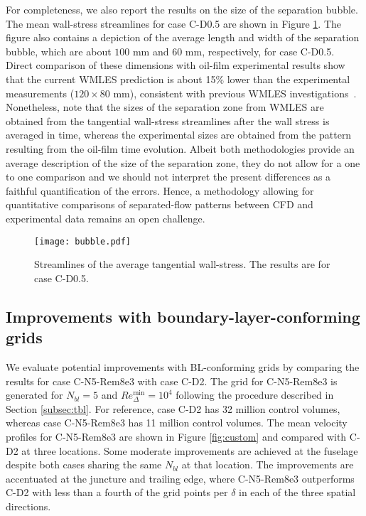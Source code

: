 \documentclass{ctr}
\begin{document}
For completeness, we also report the results on the size of the
separation bubble. The mean wall-stress streamlines for case C-D0.5
are shown in Figure \ref{fig:bubble_tau}. The figure also contains a
depiction of the average length and width of the separation bubble,
which are about $100$ mm and $60$ mm, respectively, for case C-D0.5.
Direct comparison of these dimensions with oil-film experimental
results show that the current WMLES prediction is about 15\% lower
than the experimental measurements ($120 \times 80$ mm), consistent
with previous WMLES investigations~\citep{Lozano_AIAA_2020, Iyer2020,
  Ghate2020}. Nonetheless, note that the sizes of the separation zone
from WMLES are obtained from the tangential wall-stress streamlines
after the wall stress is averaged in time, whereas the experimental
sizes are obtained from the pattern resulting from the oil-film time
evolution. Albeit both methodologies provide an average description of
the size of the separation zone, they do not allow for a one to one
comparison and we should not interpret the present differences as a
faithful quantification of the errors. Hence, a methodology allowing
for quantitative comparisons of separated-flow patterns between CFD
and experimental data remains an open challenge.
%
\begin{figure}
\centering
\texttt{[image: bubble.pdf]}
\caption{Streamlines of the average tangential wall-stress. The
  results are for case C-D0.5. \label{fig:bubble_tau}}
\end{figure}

\subsection{Improvements with boundary-layer-conforming grids}
\label{subsec:targeted}

We evaluate potential improvements with BL-conforming
grids by comparing the results for case C-N5-Rem8e3 with case
C-D2. The grid for C-N5-Rem8e3 is generated for $N_{bl}=5$ and
$Re_\Delta^\mathrm{min}=10^4$ following the procedure described in
Section \ref{subsec:tbl}.  For reference, case C-D2 has 32 million
control volumes, whereas case C-N5-Rem8e3 has 11 million control
volumes. The mean velocity profiles for C-N5-Rem8e3 are shown in
Figure \ref{fig:custom} and compared with C-D2 at three
locations. Some moderate improvements are achieved at the fuselage
despite both cases sharing the same $N_{bl}$ at that location. The
improvements are accentuated at the juncture and trailing edge, where
C-N5-Rem8e3 outperforms C-D2 with less than a fourth of the grid
points per $\delta$ in each of the three spatial directions.
\end{document}
